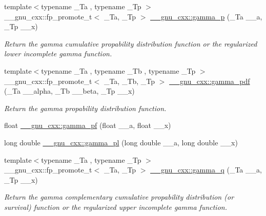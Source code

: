 \begin{DoxyCompactItemize}
\item 
{\footnotesize template$<$typename \+\_\+\+Ta , typename \+\_\+\+Tp $>$ }\\\+\_\+\+\_\+gnu\+\_\+cxx\+::fp\+\_\+promote\+\_\+t$<$ \+\_\+\+Ta, \+\_\+\+Tp $>$ \hyperlink{group__gnu__math__spec__func_ga692601fa7508c0b97bf549e6362a49b9}{\+\_\+\+\_\+gnu\+\_\+cxx\+::gamma\+\_\+p} (\+\_\+\+Ta \+\_\+\+\_\+a, \+\_\+\+Tp \+\_\+\+\_\+x)
\begin{DoxyCompactList}\small\item\em Return the gamma cumulative propability distribution function or the regularized lower incomplete gamma function. \end{DoxyCompactList}\item 
{\footnotesize template$<$typename \+\_\+\+Ta , typename \+\_\+\+Tb , typename \+\_\+\+Tp $>$ }\\\+\_\+\+\_\+gnu\+\_\+cxx\+::fp\+\_\+promote\+\_\+t$<$ \+\_\+\+Ta, \+\_\+\+Tb, \+\_\+\+Tp $>$ \hyperlink{group__gnu__math__spec__func_ga55f530c37387a6c10c601c5838f3be00}{\+\_\+\+\_\+gnu\+\_\+cxx\+::gamma\+\_\+pdf} (\+\_\+\+Ta \+\_\+\+\_\+alpha, \+\_\+\+Tb \+\_\+\+\_\+beta, \+\_\+\+Tp \+\_\+\+\_\+x)
\begin{DoxyCompactList}\small\item\em Return the gamma propability distribution function. \end{DoxyCompactList}\item 
float \hyperlink{group__gnu__math__spec__func_gac9a59be05877d3c14fa95bebcf15e8df}{\+\_\+\+\_\+gnu\+\_\+cxx\+::gamma\+\_\+pf} (float \+\_\+\+\_\+a, float \+\_\+\+\_\+x)
\item 
long double \hyperlink{group__gnu__math__spec__func_gaa37f4adf9942ce8e095f440963b330a6}{\+\_\+\+\_\+gnu\+\_\+cxx\+::gamma\+\_\+pl} (long double \+\_\+\+\_\+a, long double \+\_\+\+\_\+x)
\item 
{\footnotesize template$<$typename \+\_\+\+Ta , typename \+\_\+\+Tp $>$ }\\\+\_\+\+\_\+gnu\+\_\+cxx\+::fp\+\_\+promote\+\_\+t$<$ \+\_\+\+Ta, \+\_\+\+Tp $>$ \hyperlink{group__gnu__math__spec__func_ga10c246b2fa2ce000dc5d7c81e9e98c58}{\+\_\+\+\_\+gnu\+\_\+cxx\+::gamma\+\_\+q} (\+\_\+\+Ta \+\_\+\+\_\+a, \+\_\+\+Tp \+\_\+\+\_\+x)
\begin{DoxyCompactList}\small\item\em Return the gamma complementary cumulative propability distribution (or survival) function or the regularized upper incomplete gamma function. \end{DoxyCompactList}\item 

\end{DoxyCompactItemize}
